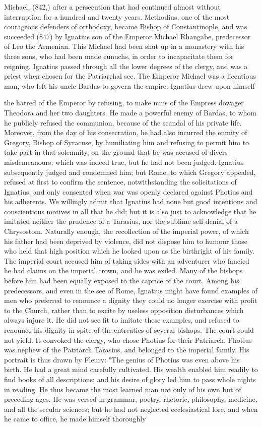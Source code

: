 Michael, (842,) after a persecution that had continued almost without interruption for a hundred and twenty years. Methodius, one of the most courageous defenders of orthodoxy, became Bishop of Constantinople, and was succeeded (847) by Ignatius son of the Emperor Michael Rhangabe, predecessor of Leo the Armenian. This Michael had been shut up in a monastery with his three sons, who had been made eunuchs, in order to incapacitate them for reigning. Ignatius passed through all the lower degrees of the clergy, and was a priest when chosen for the Patriarchal see. The Emperor Michael was a licentious man, who left his uncle Bardas to govern the empire. Ignatius drew upon himself

the hatred of the Emperor by refusing, to make nuns of the Empress dowager Theodora and her two daughters. He made a powerful enemy of Bardas, to whom he publicly refused the communion, because of the scandal of his private life. Moreover, from the day of his consecration, he had also incurred the enmity of Gregory, Bishop of Syracuse, by humiliating him and refusing to permit him to take part in that solemnity, on the ground that be was accused of divers misdemeanours; which was indeed true, but he had not been judged. Ignatius subsequently judged and condemned him; but Rome, to which Gregory appealed, refused at first to confirm the sentence, notwithstanding the solicitations of Ignatius, and only consented when war was openly declared against Photius and his adherents. We willingly admit that Ignatius had none but good intentions and conscientious motives in all that he did; but it is also just to acknowledge that he imitated neither the prudence of a Tarasius, nor the sublime self-denial of a Chrysostom. Naturally enough, the recollection of the imperial power, of which his father had been deprived by violence, did not dispose him to humour those who held that high position which he looked upon as the birthright of his family. The imperial court accused him of taking sides with an adventurer who fancied he had claims on the imperial crown, and he was exiled. Many of the bishops before him had been equally exposed to the caprice of the court. Among his predecessors, and even in the see of Rome, Ignatius might have found examples of men who preferred to renounce a dignity they could no longer exercise with profit to the Church, rather than to excite by useless opposition disturbances which always injure it. He did not see fit to imitate these examples, and refused to renounce his dignity in spite of the entreaties of several bishops. The court could not yield. It convoked the clergy, who chose Photius for their Patriarch. Photius was nephew of the Patriarch Tarasius, and belonged to the imperial family. His portrait is thus drawn by Fleury: "The genius of Photius was even above his birth. He had a great mind carefully cultivated. His wealth enabled him readily to find books of all descriptions; and his desire of glory led him to pass whole nights in reading. He thus became the most learned man not only of his own but of preceding ages. He was versed in grammar, poetry, rhetoric, philosophy, medicine, and all the secular sciences; but he had not neglected ecclesiastical lore, and when he came to office, he made himself thoroughly 